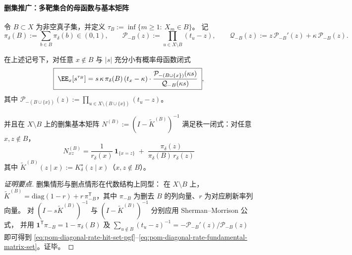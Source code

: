 \paragraph{删集推广：多靶集合的母函数与基本矩阵}
令 \(B\subset X\) 为非空真子集，并定义 \(\tau_B:=\inf\{m\ge 1:\ X_m\in B\}\)。
记
\[
\pi_\delta(B):=\sum_{b\in B}\pi_\delta(b)\in(0,1),
\qquad
\mathcal P_{-B}(z):=\prod_{u\in X\setminus B}(t_u-z),
\qquad
\mathcal Q_{-B}(z):=z\,\mathcal P_{-B}'(z)+\kappa\,\mathcal P_{-B}(z).
\]

\begin{theorem}\label{thm:pom-diagonal-rate-absorbing-set-hit-and-occupancy}
在上述记号下，对任意 \(x\notin B\) 与 \(|s|\) 充分小有概率母函数闭式
\begin{equation}\label{eq:pom-diagonal-rate-hit-set-pgf}
\boxed{\;
\EE_x[s^{\tau_B}]
=
s\,\kappa\,\pi_\delta(B)\,(t_x-\kappa)\cdot
\frac{\mathcal P_{-(B\cup\{x\})}(\kappa s)}{\mathcal Q_{-B}(\kappa s)}\; } ,
\end{equation}
其中 \(\mathcal P_{-(B\cup\{x\})}(z):=\prod_{u\in X\setminus(B\cup\{x\})}(t_u-z)\)。
\par
并且在 \(X\setminus B\) 上的删集基本矩阵
\(
N^{(B)}:=(I-\widetilde K^{(B)})^{-1}
\)
满足秩一闭式：对任意 \(x,z\notin B\)，
\begin{equation}\label{eq:pom-diagonal-rate-fundamental-matrix-set}
\boxed{\;
N^{(B)}_{xz}
=\frac{1}{r_\delta(x)}\,\mathbf 1_{\{x=z\}}
\;+\;
\frac{\pi_\delta(z)}{\pi_\delta(B)\,r_\delta(z)}\;}
\end{equation}
其中 \(\widetilde K^{(B)}(z\mid x):=K^\star_\delta(z\mid x)\)（\(x,z\notin B\)）。
\end{theorem}
\begin{proof}[证明要点]
删集情形与删点情形在代数结构上同型：
在 \(X\setminus B\) 上，\(\widetilde K^{(B)}=\mathrm{diag}(1-r)+r\,\pi_{-B}^{\mathsf T}\)，其中 \(\pi_{-B}\) 为删去 \(B\) 的列向量、\(r\) 为对应刷新率列向量。
对 \((I-s\widetilde K^{(B)})^{-1}\) 与 \((I-\widetilde K^{(B)})^{-1}\) 分别应用 Sherman--Morrison 公式，
并用 \(\mathbf 1^{\mathsf T}\pi_{-B}=1-\pi_\delta(B)\) 及
\(
\sum_{u\notin B}(t_u-z)^{-1}=-\mathcal P_{-B}'(z)/\mathcal P_{-B}(z)
\)
即可得到 \eqref{eq:pom-diagonal-rate-hit-set-pgf}--\eqref{eq:pom-diagonal-rate-fundamental-matrix-set}。证毕。
\end{proof}


